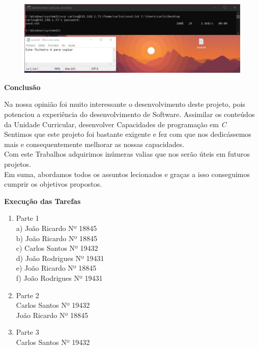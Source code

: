 \documentclass{article}
\begin{document}
	\vspace{2 em}
	
	\begin{figure}[!htb]
		\centering
		\includegraphics[scale=0.5]{tp_sosd_d2}
	\end{figure}

	\newpage
	\centerline{\textbf{Conclusão}}
	\vspace{5 em}
	
	Na nossa opinião foi muito interessante o desenvolvimento deste projeto, pois potenciou a experiência do desenvolvimento de Software. Assimilar os conteúdos da Unidade Curricular, desenvolver Capacidades de programação em \textit{C}\\
	
	\vspace{1 em}
	Sentimos que este projeto foi bastante exigente e fez com que nos dedicássemos mais e consequentemente melhorar as nossas capacidades.
	\\
	
	\vspace{1 em}
	Com este Trabalhos adquirimos inúmeras valias que nos serão úteis em futuros projetos.
	\\
	
	\vspace{1 em}
	Em suma, abordamos todos os assuntos lecionados e graças a isso conseguimos cumprir os objetivos propostos.
	\\
	
	\newpage

	\centerline{\textbf{Execução das Tarefas}}
	
	\vspace{3 em}
	\begin{enumerate}
		\item Parte 1 \\
			a) João Ricardo Nº 18845 \\
			b) João Ricardo Nº 18845 \\ 
			c) Carlos Santos Nº 19432 \\
			d) João Rodrigues Nº 19431 \\
			e) João Ricardo Nº 18845  \\
			f) João Rodrigues Nº 19431 \\
		\item Parte 2 \\ Carlos Santos Nº 19432 \\ João Ricardo Nº 18845 
		\item Parte 3 \\ Carlos Santos Nº 19432
	\end{enumerate}
	\vspace{3 em}
	
\end{document}
